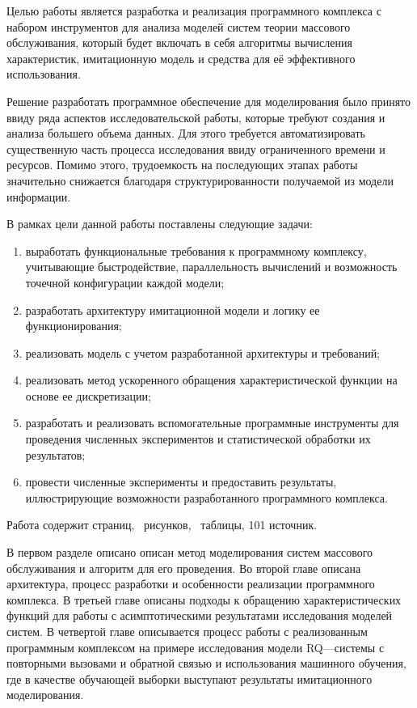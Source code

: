  Целью работы является разработка и реализация программного комплекса с набором инструментов для анализа моделей систем теории массового обслуживания, который будет включать в себя алгоритмы вычисления характеристик, имитационную модель и средства для её эффективного использования.

Решение разработать программное обеспечение для моделирования было принято ввиду ряда аспектов исследовательской работы, которые требуют создания и анализа большего объема данных. Для этого требуется автоматизировать существенную часть процесса исследования ввиду ограниченного времени и ресурсов. Помимо этого, трудоемкость на последующих этапах работы значительно снижается благодаря структурированности получаемой из модели информации.

В рамках цели данной работы поставлены следующие задачи:
\begin{enumerate}
	\item выработать функциональные требования к программному комплексу, учитывающие быстродействие, параллельность вычислений и возможность точечной конфигурации каждой модели;
	\item разработать архитектуру имитационной модели и логику ее функционирования;
	\item реализовать модель с учетом разработанной архитектуры и требований;
	\item реализовать метод ускоренного обращения характеристической функции на основе ее дискретизации;
	\item разработать и реализовать вспомогательные программные инструменты для проведения численных экспериментов и статистической обработки их результатов;
	\item провести численные эксперименты и предоставить результаты, иллюстрирующие возможности разработанного программного комплекса.
\end{enumerate}

Работа содержит \pageref{LastPage} страниц, \totalfigures\ рисунков, \totaltables\ таблицы, 101 источник.

В первом разделе описано описан метод моделирования систем массового обслуживания и алгоритм для его проведения. Во второй главе описана архитектура, процесс разработки и особенности реализации программного комплекса. В третьей главе описаны подходы к обращению характеристических функций для работы с асимптотическими результатами исследования моделей систем. В четвертой главе описывается процесс работы с реализованным программным комплексом на примере исследования модели RQ---системы с повторными вызовами и обратной связью и использования машинного обучения, где в качестве обучающей выборки выступают результаты имитационного моделирования.
 \clearpage
 